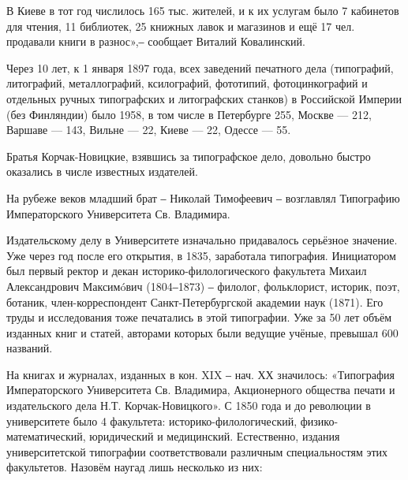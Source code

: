 \vspace{0.5cm}

В Киеве в тот год числилось 165 тыс. жителей, и к их услугам было 7 кабинетов
для чтения, 11 библиотек, 25 книжных лавок и магазинов и ещё 17 чел. продавали
книги в разнос»,‒ сообщает  Виталий Ковалинский.

Через 10 лет, к 1 января 1897 года, всех заведений печатного дела (типографий,
литографий, металлографий, ксилографий, фототипий, фотоцинкографий и отдельных
ручных типографских и литографских станков) в Российской Империи (без
Финляндии) было 1958, в том числе в Петербурге 255, Москве — 212, Варшаве —
143, Вильне — 22, Киеве — 22, Одессе — 55.

Братья Корчак-Новицкие, взявшись за типографское дело, довольно быстро
оказались в числе известных издателей.

На рубеже веков младший брат ‒ Николай Тимофеевич ‒ возглавлял Типографию
Императорского Университета Св. Владимира. 

\vspace{0.5cm}

Издательскому делу в Университете изначально придавалось серьёзное значение.
Уже через год после его открытия, в 1835, заработала типография. Инициатором
был первый ректор и декан историко-филологического факультета Михаил
Александрович Максимóвич (1804‒1873) ‒ филолог, фольклорист, историк, поэт,
ботаник, член-корреспондент Санкт-Петербургской академии наук (1871). Его труды
и исследования тоже печатались в этой типографии. Уже за 50 лет объём изданных
книг и статей, авторами которых были ведущие учёные, превышал 600 названий. 

\vspace{0.5cm}

На книгах и журналах, изданных в кон. XIX ‒ нач. ХХ значилось: «Типография
Императорского Университета Св. Владимира, Акционерного общества печати и
издательского дела Н.Т. Корчак-Новицкого». С 1850 года и до революции в
университете было 4 факультета: историко-филологический, физико-математический,
юридический и медицинский. Естественно, издания университетской типографии
соответствовали различным специальностям этих факультетов. Назовём наугад лишь
несколько из них:


